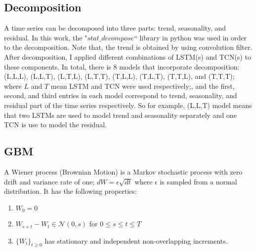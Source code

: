 \documentclass[12pt, A4]{article}
\begin{document}
\subsection{Decomposition}
A time series can be decomposed into three parts: trend, seasonality, and residual. In this work, the "$stat\_decompose$`` library in python was used in order to the decomposition. Note that, the trend is obtained by using convolution filter. After decomposition, I applied different combinations of LSTM(s) and TCN(s) to these components. In total, there is $8$ models that incorporate decomposition: (L,L,L), (L,L,T), (L,T,L), (L,T,T), (T,L,L), (T,L,T), (T,T,L), and (T,T,T); where $L$ and $T$ mean LSTM  and TCN were used respectively;, and the first, second, and third entries in each model correspond to trend, seasonality, and residual part of the time series respectively. So for example, (L,L,T) model means that two LSTMs are used to model trend and seasonality separately and one TCN is use to model the residual. \\

\subsection{GBM}

A Wiener process (Brownian Motion) is a Markov stochastic process with zero drift and variance rate of one; $dW = \epsilon \sqrt{dt}$ where $\epsilon$ is sampled from a normal distribution. It has the following properties:
\begin{enumerate}
	\item $W_{0}=0$
	\item $W_{s+t}-W_{t} \in \mathcal{N}(0,s)$ for $0\leq s\leq t \leq T$
	\item $\{W_{t}\}_{t\geq 0}$ has stationary and independent non-overlapping increments. 
\end{enumerate}
 
\end{document}
